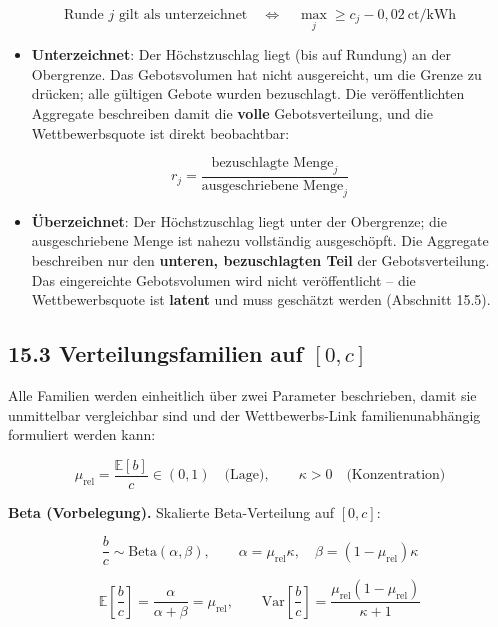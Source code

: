 \documentclass[
  a4paper,
  10pt]{article}
\providecommand{\tightlist}{%
  \setlength{\itemsep}{0pt}\setlength{\parskip}{0pt}}
\begin{document}
\[ \text{Runde } j \text{ gilt als unterzeichnet} \quad \Leftrightarrow \quad \max_j \geq c_j - 0{,}02\ \text{ct/kWh} \]

\begin{itemize}
\tightlist
\item
  \textbf{Unterzeichnet}: Der Höchstzuschlag liegt (bis auf Rundung) an
  der Obergrenze. Das Gebotsvolumen hat nicht ausgereicht, um die Grenze
  zu drücken; alle gültigen Gebote wurden bezuschlagt. Die
  veröffentlichten Aggregate beschreiben damit die \textbf{volle}
  Gebotsverteilung, und die Wettbewerbsquote ist direkt beobachtbar:
\end{itemize}

\[ r_j = \frac{\text{bezuschlagte Menge}_j}{\text{ausgeschriebene Menge}_j} \]

\begin{itemize}
\tightlist
\item
  \textbf{Überzeichnet}: Der Höchstzuschlag liegt unter der Obergrenze;
  die ausgeschriebene Menge ist nahezu vollständig ausgeschöpft. Die
  Aggregate beschreiben nur den \textbf{unteren, bezuschlagten Teil} der
  Gebotsverteilung. Das eingereichte Gebotsvolumen wird nicht
  veröffentlicht -- die Wettbewerbsquote ist \textbf{latent} und muss
  geschätzt werden (Abschnitt 15.5).
\end{itemize}

\hypertarget{verteilungsfamilien-auf-0-c}{%
\subsection{\texorpdfstring{15.3 Verteilungsfamilien auf
\([0, c]\)}{15.3 Verteilungsfamilien auf {[}0, c{]}}}\label{verteilungsfamilien-auf-0-c}}

Alle Familien werden einheitlich über zwei Parameter beschrieben, damit
sie unmittelbar vergleichbar sind und der Wettbewerbs-Link
familienunabhängig formuliert werden kann:

\[ \mu_{\mathrm{rel}} = \frac{\mathbb{E}[b]}{c} \in (0,1) \quad \text{(Lage)}, \qquad \kappa > 0 \quad \text{(Konzentration)} \]

\textbf{Beta (Vorbelegung).} Skalierte Beta-Verteilung auf \([0,c]\):

\[ \frac{b}{c} \sim \mathrm{Beta}(\alpha, \beta), \qquad \alpha = \mu_{\mathrm{rel}} \kappa, \quad \beta = (1-\mu_{\mathrm{rel}})\kappa \]

\[ \mathbb{E}\left[\frac{b}{c}\right] = \frac{\alpha}{\alpha+\beta} = \mu_{\mathrm{rel}}, \qquad \mathrm{Var}\left[\frac{b}{c}\right] = \frac{\mu_{\mathrm{rel}}(1-\mu_{\mathrm{rel}})}{\kappa+1} \]
\end{document}

